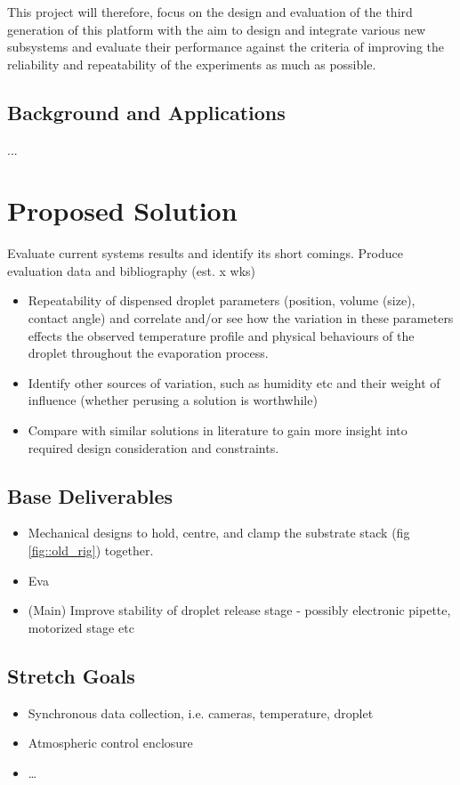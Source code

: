 \documentclass[11pt, a4paper, twoside, openright]{report}
\begin{document}
This project will therefore, focus on the design and evaluation of the third generation of this platform with the aim to design and integrate various new subsystems and evaluate their performance against the criteria of improving the reliability and repeatability of the experiments as much as possible.

\subsection{Background and Applications}
...

\section{Proposed Solution}

Evaluate current systems results and identify its short comings. Produce evaluation data and bibliography (est. x wks)
\begin{itemize}
  \item Repeatability of dispensed droplet parameters (position, volume (size), contact angle) and correlate and/or see how the variation in these parameters effects the observed temperature profile and physical behaviours of the droplet throughout the evaporation process.
  \item Identify other sources of variation, such as humidity etc and their weight of influence (whether perusing a solution is worthwhile)
  \item Compare with similar solutions in literature to gain more insight into required design consideration and constraints.
\end{itemize}



\subsection{Base Deliverables}
\begin{itemize}
  \item Mechanical designs to hold, centre, and clamp the substrate stack (fig \ref{fig::old_rig}) together.
  \item Eva
  \item (Main) Improve stability of droplet release stage - possibly electronic pipette, motorized stage etc
\end{itemize}

\subsection{Stretch Goals}
\begin{itemize}
  \item Synchronous data collection, i.e. cameras, temperature, droplet
  \item Atmospheric control enclosure
  \item \dots
\end{itemize}
\end{document}
